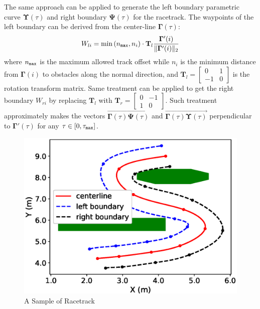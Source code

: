 \documentclass[conference, onecolumn]{IEEEtran}
\begin{document}
The same approach can be applied to generate the left boundary parametric curve $\mathbf{\Upsilon}(\tau)$ and right boundary $\mathbf{\Psi}(\tau)$ for the racetrack. The waypoints of the left boundary can be derived from the center-line $\mathbf{\Gamma}(\tau)$:
\begin{equation}\label{innerwaypoint}
	W_{li} = \min{(n_{\tt max},n_i)}\cdot  	\mathbf{T}_{l} \frac{\mathbf{\Gamma}'(i)}{\| \mathbf{\Gamma}'(i)\|_2 }
\end{equation} 
where $n_{\tt max}$ is the maximum allowed track offset while $n_i$ is the minimum distance from $\mathbf{\Gamma}(i)$ to obstacles along the normal direction, and $\mathbf{T}_{l}=\begin{bmatrix}
	0 & 1 \\
	-1 & 0
\end{bmatrix}$ is the rotation transform matrix.
Same treatment can be applied to get the right boundary $W_{ri}$ by replacing $\mathbf{T}_l$ with $\mathbf{T}_{r}=\begin{bmatrix}
	0 & -1 \\
	1 & 0
\end{bmatrix}$.
Such treatment approximately makes the vectors $\overrightarrow{\mathbf{\Gamma}(\tau)\mathbf{\Psi}(\tau)}$ and $\overrightarrow{\mathbf{\Gamma}(\tau)\mathbf{\Upsilon}(\tau)}$ perpendicular to $\mathbf{\Gamma}'(\tau)$ for any $\tau \in [0,\tau_{\tt max}]$.

\begin{figure}
	\centering
	\includegraphics[scale=0.5]{racetrack.eps}
	\caption{A Sample of Racetrack}
	\label{fig_racetrack}
\end{figure}
\end{document}
